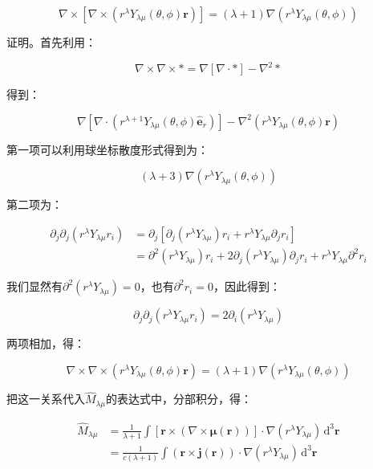 \begin{equation}
\nabla\times[\nabla\times(r^{\lambda}Y_{\lambda\mu}(\theta,\phi)\boldsymbol{r})]=(\lambda+1)\nabla(r^{\lambda}Y_{\lambda\mu}(\theta,\phi))
\end{equation}

\begin{booknote*}
证明。首先利用：

\[
\nabla\times\nabla\times*=\nabla[\nabla\cdot*]-\nabla^{2}*
\]

得到：

\[
\nabla[\nabla\cdot(r^{\lambda+1}Y_{\lambda\mu}(\theta,\phi)\hat{\boldsymbol{e}}_{r})]-\nabla^{2}(r^{\lambda}Y_{\lambda\mu}(\theta,\phi)\boldsymbol{r})
\]

第一项可以利用球坐标散度形式得到为：

\[
(\lambda+3)\nabla(r^{\lambda}Y_{\lambda\mu}(\theta,\phi))
\]

第二项为：

\begin{align*}
\partial_{j}\partial_{j}(r^{\lambda}Y_{\lambda\mu}r_{i}) & =\partial_{j}[\partial_{j}(r^{\lambda}Y_{\lambda\mu})r_{i}+r^{\lambda}Y_{\lambda\mu}\partial_{j}r_{i}]\\
 & =\partial^{2}(r^{\lambda}Y_{\lambda\mu})r_{i}+2\partial_{j}(r^{\lambda}Y_{\lambda\mu})\partial_{j}r_{i}+r^{\lambda}Y_{\lambda\mu}\partial^{2}r_{i}
\end{align*}

我们显然有$\partial^{2}(r^{\lambda}Y_{\lambda\mu})=0$，也有$\partial^{2}r_{i}=0$，因此得到：

\[
\partial_{j}\partial_{j}(r^{\lambda}Y_{\lambda\mu}r_{i})=2\partial_{i}(r^{\lambda}Y_{\lambda\mu})
\]

两项相加，得：

\[
\nabla\times\nabla\times(r^{\lambda}Y_{\lambda\mu}(\theta,\phi)\boldsymbol{r})=(\lambda+1)\nabla\left(r^{\lambda}Y_{\lambda\mu}(\theta,\phi)\right)
\]
\end{booknote*}
把这一关系代入$\hat{M}_{\lambda\mu}$的表达式中，分部积分，得：

\begin{align}
\hat{M}_{\lambda\mu} & =\frac{1}{\lambda+1}\int[\boldsymbol{r}\times(\nabla\times\boldsymbol{\mu}(\boldsymbol{r}))]\cdot\nabla(r^{\lambda}Y_{\lambda\mu})\,\mathrm{d}^{3}\boldsymbol{r}\\
 & =\frac{1}{c(\lambda+1)}\int(\boldsymbol{r}\times\boldsymbol{j}(\boldsymbol{r}))\cdot\nabla(r^{\lambda}Y_{\lambda\mu})\,\mathrm{d}^{3}\boldsymbol{r}\label{eq:=009759=006001=0078C1=00591A=006781=0077E9}
\end{align}

